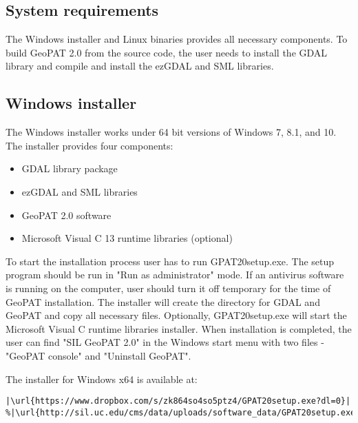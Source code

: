 \subsection{System requirements}

The Windows installer and Linux binaries provides all necessary components. 
To build GeoPAT 2.0 from the source code, the user needs to install the GDAL library and compile and install the ezGDAL and SML libraries.

\subsection{Windows installer}
The Windows installer works under 64 bit versions of Windows 7, 8.1, and 10.
The installer provides four components:
\begin{itemize}
  \item{GDAL library package}
  \item{ezGDAL and SML libraries}
  \item{GeoPAT 2.0 software}
  \item{Microsoft Visual C 13 runtime libraries (optional)}
\end{itemize}
To start the installation process user has to run GPAT20setup.exe.
The setup program should be run in "Run as administrator" mode.
If an antivirus software is running on the computer, user should turn it off temporary for the time of GeoPAT installation.
The installer will create the directory for GDAL and GeoPAT and copy all necessary files.
Optionally, GPAT20setup.exe will start the Microsoft Visual C runtime libraries installer.
When installation is completed, the user can find "SIL GeoPAT 2.0" in the Windows start menu with two files - "GeoPAT console" and "Uninstall GeoPAT".

The installer for Windows x64 is available at:

\begin{lstlisting}[escapechar=|]
|\url{https://www.dropbox.com/s/zk864so4so5ptz4/GPAT20setup.exe?dl=0}|
%|\url{http://sil.uc.edu/cms/data/uploads/software_data/GPAT20setup.exe}|
\end{lstlisting}

